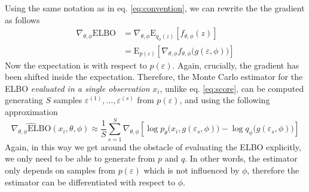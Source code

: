 Using the same notation as in eq. \eqref{eq:convention}, we can rewrite the the gradient as follows
\begin{align*}
    \nabla_{\theta,\phi} \mathrm{ELBO} &= \nabla_{\theta,\phi} \mathrm{E}_{q_\phi(z)}\left[f_{\theta,\phi}(z)\right]\\
    &= \mathrm{E}_{p(\varepsilon)}\left[\nabla_{\theta,\phi} f_{\theta,\phi}\big(g(\varepsilon, \phi)\big)\right]
\end{align*}
Now the expectation is with respect to $p(\varepsilon)$. Again, crucially, the gradient has been shifted inside the expectation. Therefore, the Monte Carlo estimator for the ELBO \textit{evaluated in a single observation} $x_i$, unlike eq. \eqref{eq:score}, can be computed generating $S$ samples $\varepsilon^{(1)}, \dots, \varepsilon^{(s)}$ from $p(\varepsilon)$, and using the following approximation
$$\widehat{\nabla_{\theta,\phi} \mathrm{ELBO}}(x_i, \theta, \phi) \approx \frac{1}{S} \sum_{s=1}^{S} \nabla_{\theta,\phi} \left[ \log p_\theta\big(x_i, g(\varepsilon_s, \phi)\big) - \log q_\phi\big(g(\varepsilon_s, \phi)\big) \right]$$
Again, in this way we get around the obstacle of evaluating the ELBO explicitly, we only need to be able to generate from $p$ and $q$. In other words, the estimator only depends on samples from $p(\varepsilon)$ which is not influenced by $\phi$, therefore the estimator can be differentiated with respect to $\phi$.

